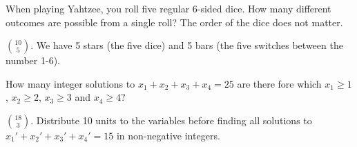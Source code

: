 \begin{questions}

	\begin{answer}
	\end{answer}
	
	


\question When playing Yahtzee, you roll five regular 6-sided dice.  How many different outcomes are possible from a single roll?  The order of the dice does not matter.

	\begin{answer}
	${10 \choose 5}$.  We have 5 stars (the five dice) and 5 bars (the five switches between the number 1-6).
	\end{answer}
	
	


\question How many integer solutions to $x_1 + x_2 + x_3 + x_4  = 25$ are there fore which $x_1 \ge 1$, $x_2 \ge 2$, $x_3 \ge 3$  and $x_4 \ge 4$?

	\begin{answer}
	${18 \choose 3}$.  Distribute 10 units to the variables before finding all solutions to $x_1' + x_2' + x_3' + x_4' = 15$ in non-negative integers.
	\end{answer}
	

\end{questions}
